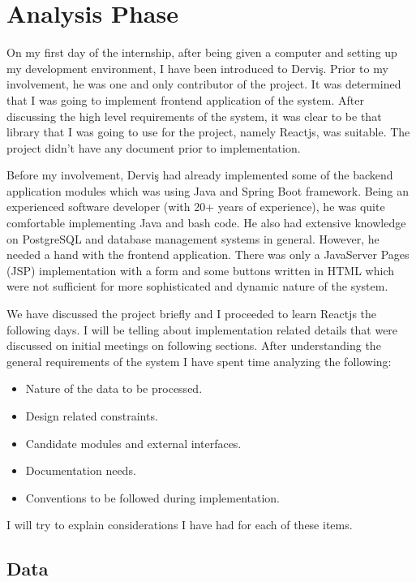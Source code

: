 \section{Analysis Phase}
On my first day of the internship, after being given a computer and setting up 
my development environment, I have been introduced to Derviş. Prior to my 
involvement, he was one and only contributor of the project. It was determined 
that I was going to implement frontend application of the system. After 
discussing the high level requirements of the system, it was clear to be that 
library that I was going to use for the project, namely Reactjs, was suitable. 
The project didn't have any document prior to implementation.
\par
Before my involvement, Derviş had already implemented some of the backend 
application modules which was using Java and Spring Boot framework. Being an 
experienced software developer (with 20+ years of experience), he was quite 
comfortable implementing Java and bash code. He also had extensive knowledge 
on PostgreSQL and database management systems in general. However, he needed 
a hand with the frontend application. There was only a JavaServer Pages (JSP) 
implementation with a form and some buttons written in HTML which were not 
sufficient for more sophisticated and dynamic nature of the system.
\par
We have discussed the project briefly and I proceeded to learn Reactjs the 
following days. I will be telling about implementation related details that 
were discussed on initial meetings on following sections. After understanding 
the general requirements of the system I have spent time analyzing the 
following:
\begin{itemize}
    \item Nature of the data to be processed.
    \item Design related constraints.
    \item Candidate modules and external interfaces.
    \item Documentation needs.
    \item Conventions to be followed during implementation.
\end{itemize}

I will try to explain considerations I have had for each of these items.


\subsection{Data}
